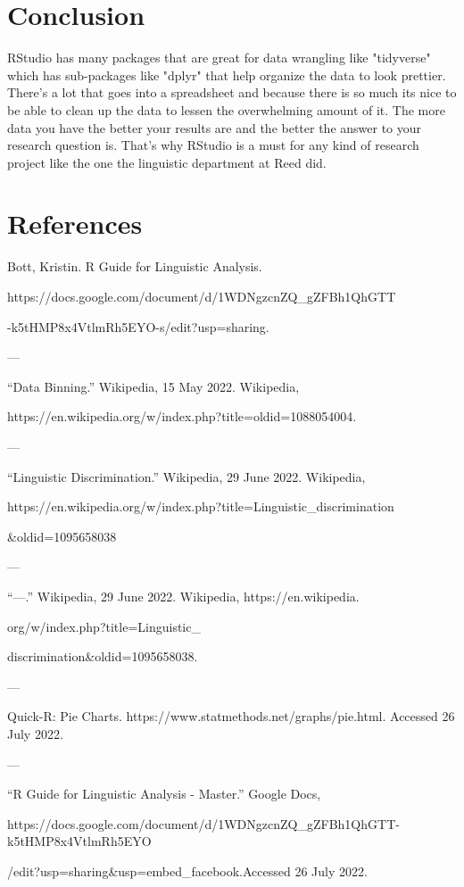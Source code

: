 \documentclass{scrartcl}
\begin{document}
\section{Conclusion}
RStudio has many packages that are great for data wrangling like "tidyverse" which has sub-packages like "dplyr" that help organize the data to look prettier. There's a lot that goes into a spreadsheet and because there is so much its nice to be able to clean up the data to lessen the overwhelming amount of it. The more data you have the better your results are and the better the answer to your research question is. That's why RStudio is a must for any kind of research project like the one the linguistic department at Reed did. 


\newpage
\section{References}
\SMALL Bott, Kristin. R Guide for Linguistic Analysis. \par 
https://docs.google.com/document/d/1WDNgzcnZQ_gZFBh1QhGTT \par
-k5tHMP8x4VtlmRh5EYO-s/edit?usp=sharing. \par

---

\SMALL “Data Binning.” Wikipedia, 15 May 2022. Wikipedia, \par
https://en.wikipedia.org/w/index.php?title=oldid=1088054004. \par

---

\SMALL “Linguistic Discrimination.” Wikipedia, 29 June 2022. Wikipedia,\par 
https://en.wikipedia.org/w/index.php?title=Linguistic_discrimination\par
&oldid=1095658038\par

---

“---.” Wikipedia, 29 June 2022. Wikipedia, https://en.wikipedia. \par
org/w/index.php?title=Linguistic_ \par discrimination&oldid=1095658038. \par

---

Quick-R: Pie Charts. https://www.statmethods.net/graphs/pie.html. Accessed 26 July 2022.\par

---

“R Guide for Linguistic Analysis - Master.” Google Docs, \par https://docs.google.com/document/d/1WDNgzcnZQ_gZFBh1QhGTT-k5tHMP8x4VtlmRh5EYO \par
/edit?usp=sharing&usp=embed_facebook.Accessed 26 July 2022.\par
\end{document}
